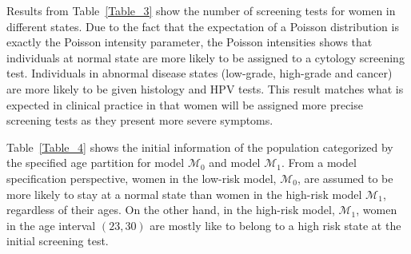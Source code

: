 \documentclass{article}
\begin{document}
Results from Table~\ref{Table_3} show the number of screening tests for women in different states. Due to the fact that the expectation of a Poisson distribution is exactly the Poisson intensity parameter, the Poisson intensities shows that individuals at normal state are more likely to be assigned to a cytology screening test. Individuals in abnormal disease states (low-grade, high-grade and cancer) are more likely to be given histology and HPV tests. This result matches what is expected in clinical practice in that women will be assigned more precise screening tests as they present more severe symptoms.

\begin{table}[ht!]
	\centering
	\caption{Maximum likelihood estimates of Poisson intensities for the number of tests conditioned on true state.}
	\label{Table_3}
\end{table}

Table~\ref{Table_4} shows the initial information of the population categorized by the specified age partition for model $\mathcal{M}_0$ and model $\mathcal{M}_1$. From a model specification perspective, women in the low-risk model, $\mathcal{M}_0$, are assumed to be more likely to stay at a normal state than women in the high-risk model $\mathcal{M}_1$, regardless of their ages. On the other hand, in the high-risk model, $\mathcal{M}_1$, women in the age interval $(23, 30)$ are mostly like to belong to a high risk state at the initial screening test. 
\end{document}
